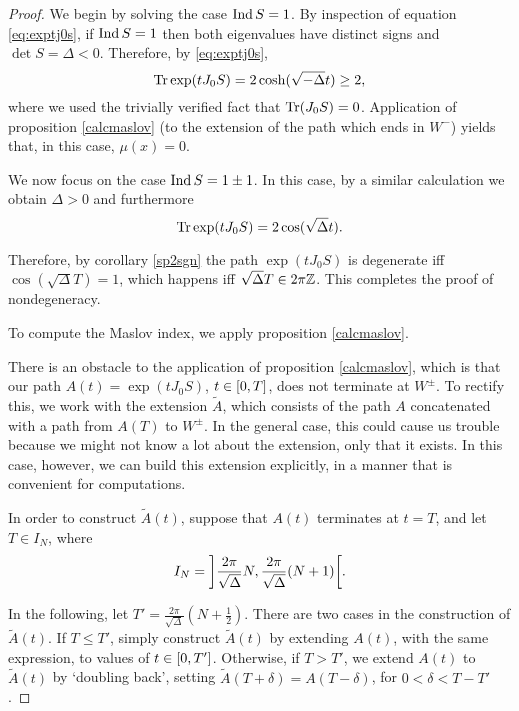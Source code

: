 \begin{proof}
We begin by solving the case $\operatorname{Ind} S = 1$. By inspection of equation \eqref{eq:exptj0s}, if $\operatorname{Ind} S = 1$ then both eigenvalues have distinct signs and $\det S = \Delta < 0$. Therefore, by \eqref{eq:exptj0s},
\begin{equation}
\operatorname{Tr} \exp(t J_0 S) = 2 \cosh(\sqrt{-\Delta} t) \geq 2,
\end{equation}
where we used the trivially verified fact that $\operatorname{Tr}(J_0 S) = 0$. Application of proposition \ref{calcmaslov} (to the extension of the path which ends in $W^-$) yields that, in this case, $\mu(x) = 0$.

We now focus on the case $\operatorname{Ind} S = 1 \pm 1$. In this case, by a similar calculation we obtain $\Delta > 0$ and furthermore
\begin{equation}
\operatorname{Tr} \exp(t J_0 S) = 2 \cos(\sqrt\Delta t).
\end{equation}

Therefore, by corollary \ref{sp2sgn} the path $\exp(t J_0 S)$ is degenerate iff $\cos(\sqrt \Delta T) = 1$, which happens iff $\sqrt\Delta T \in 2 \pi \mathbb{Z}$. This completes the proof of nondegeneracy.

\smallskip

To compute the Maslov index, we apply proposition \ref{calcmaslov}.

There is an obstacle to the application of proposition \ref{calcmaslov}, which is that our path $A(t) = \exp(t J_0 S)$, $t \in \interval 0 T$, does not terminate at $W^\pm$. To rectify this, we work with the extension $\tilde A$, which consists of the path $A$ concatenated with a path from $A(T)$ to $W^\pm$. In the general case, this could cause us trouble because we might not know a lot about the extension, only that it exists. In this case, however, we can build this extension explicitly, in a manner that is convenient for computations.

In order to construct $\tilde A(t)$, suppose that $A(t)$ terminates at $t = T$, and let $T \in I_N$, where
\begin{equation}
I_N = \ointerval[scaled]{\frac{2\pi}{\sqrt\Delta} N}{\frac{2\pi}{\sqrt\Delta} (N+1)}.
\end{equation}

In the following, let $T' = \frac{2\pi}{\sqrt\Delta}(N+\frac12)$. There are two cases in the construction of $\tilde A(t)$. If $T \leq T'$, simply construct $\tilde A(t)$ by extending $A(t)$, with the same expression, to values of $t \in \interval 0 {T'}$. Otherwise, if $T > T'$, we extend $A(t)$ to $\tilde A(t)$ by `doubling back', setting $\tilde A(T+\delta) = A(T-\delta)$, for $0 < \delta < T-T'$.


\end{proof}
